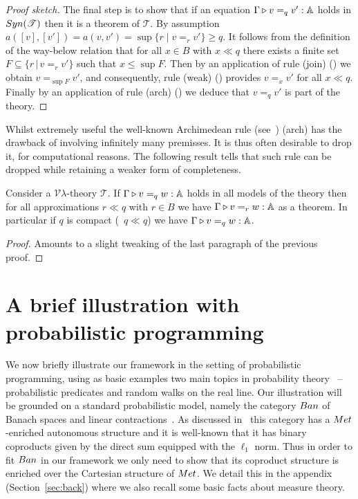 \documentclass[a4paper,UKenglish,cleveref, autoref, thm-restate]{lipics-v2021}
\begin{document}
\begin{proof}[Proof sketch]
The final step is to show that if an equation $\Gamma \triangleright v =_q v' : \mathbb{A}$
holds in $\catfont{Syn}(\mathscr{T})$ then it is a theorem of $\mathscr{T}$. By
assumption $a([v],[v']) = a(v,v') =  \sup{ \{r \mid v =_r v'\}} \geq q$. It
follows from the definition of the way-below relation that for all $x \in B$
with $x \ll q$ there exists a finite set $F \subseteq \{r \, \vert \, v =_r
v'\}$ such that $x \leq \sup F$. Then by an application of rule (join)
(\cite[Figure 4]{dahlqvist2023syntactic}) we obtain $v =_{\sup F} v'$, and
consequently, rule (weak) (\cite[Figure 4]{dahlqvist2023syntactic}) provides $v
=_x v'$ for all $x \ll q$. Finally by an application of rule (arch)
(\cite[Figure 4]{dahlqvist2023syntactic}) we deduce that $v =_q v'$ is part of
the theory.
\end{proof}
Whilst extremely useful the well-known Archimedean rule
(see~\cite{dahlqvist22,dahlqvist2023syntactic,mardare2016quantitative}) (arch)
has the drawback of involving infinitely many premisses. It is thus often
desirable to drop it, for computational reasons. The following result tells that
such rule can be dropped while retaining a weaker form of completeness.
\begin{theorem}
        Consider a $\mathcal{V}\lambda$-theory $\mathscr{T}$.  If 
        $\Gamma \triangleright v =_q w : \mathbb{A}$ holds in all
        models of the theory then for all approximations $r \ll q$ with $r \in
        B$ we have $\Gamma \triangleright v =_r w : \mathbb{A}$ as a theorem. In particular
        if $q$ is compact (\ie\ $q \ll q$) we have $\Gamma \triangleright v =_q w :
        \mathbb{A}$.
\end{theorem}

\begin{proof}
Amounts to a slight tweaking of the last paragraph of the previous proof.
\end{proof}
\section{A brief illustration with probabilistic programming}
\label{sec:ex}

We now briefly illustrate our framework in the setting of probabilistic
programming, using as basic examples two main topics in probability
theory~\cite{dudley18} -- probabilistic predicates and random walks on the real
line.  Our illustration will be grounded on a standard probabilistic model,
namely the category $\Ban$ of Banach spaces and linear
contractions~\cite{dahlqvist19}. As discussed
in~\cite{dahlqvist22,dahlqvist2023syntactic} this category has a
$\Met$-enriched autonomous structure and it is well-known that it has binary
coproducts given by the direct sum equipped with the $\ell_1$ norm. Thus in
order to fit $\Ban$ in our framework we only need to show that its coproduct
structure is enriched over the Cartesian structure of $\Met$. We detail this in
the appendix (Section~\ref{sec:back}) where we also recall some basic facts
about measure theory.
\end{document}
